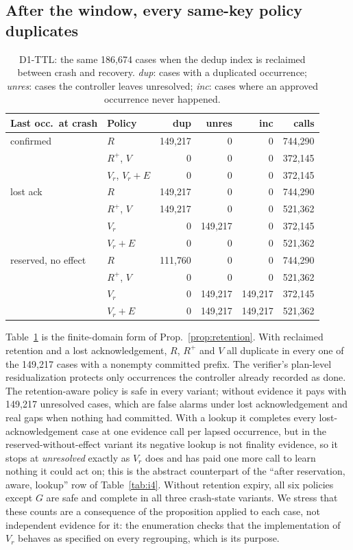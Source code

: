 \documentclass[conference,10pt]{IEEEtran}
\begin{document}
\subsection{After the window, every same-key policy duplicates}
\begin{table}[t]
\centering\footnotesize
\caption{D1-TTL: the same 186{,}674 cases when the dedup index is reclaimed between crash and recovery. \emph{dup}: cases with a duplicated occurrence; \emph{unres}: cases the controller leaves unresolved; \emph{inc}: cases where an approved occurrence never happened.}
\label{tab:d1ttl}
\setlength{\tabcolsep}{3.5pt}
\begin{tabular}{@{}llrrrr@{}}
\toprule
Last occ.\ at crash & Policy & dup & unres & inc & calls\\
\midrule
confirmed & $R$ & 149{,}217 & 0 & 0 & 744{,}290\\
 & $R^{+}$, $V$ & 0 & 0 & 0 & 372{,}145\\
 & $V_r$, $V_r{+}E$ & 0 & 0 & 0 & 372{,}145\\
\midrule
lost ack & $R$ & 149{,}217 & 0 & 0 & 744{,}290\\
 & $R^{+}$, $V$ & 149{,}217 & 0 & 0 & 521{,}362\\
 & $V_r$ & 0 & 149{,}217 & 0 & 372{,}145\\
 & $V_r{+}E$ & 0 & 0 & 0 & 521{,}362\\
\midrule
reserved, no effect & $R$ & 111{,}760 & 0 & 0 & 744{,}290\\
 & $R^{+}$, $V$ & 0 & 0 & 0 & 521{,}362\\
 & $V_r$ & 0 & 149{,}217 & 149{,}217 & 372{,}145\\
 & $V_r{+}E$ & 0 & 149{,}217 & 149{,}217 & 521{,}362\\
\bottomrule
\end{tabular}
\end{table}
Table~\ref{tab:d1ttl} is the finite-domain form of Prop.~\ref{prop:retention}. With reclaimed retention and a lost acknowledgement, $R$, $R^{+}$ and $V$ all duplicate in every one of the 149{,}217 cases with a nonempty committed prefix. The verifier's plan-level residualization protects only occurrences the controller already recorded as done. The retention-aware policy is safe in every variant; without evidence it pays with 149{,}217 unresolved cases, which are false alarms under lost acknowledgement and real gaps when nothing had committed. With a lookup it completes every lost-acknowledgement case at one evidence call per lapsed occurrence, but in the reserved-without-effect variant its negative lookup is not finality evidence, so it stops at \emph{unresolved} exactly as $V_r$ does and has paid one more call to learn nothing it could act on; this is the abstract counterpart of the ``after reservation, aware, lookup'' row of Table~\ref{tab:i4}. Without retention expiry, all six policies except $G$ are safe and complete in all three crash-state variants. We stress that these counts are a consequence of the proposition applied to each case, not independent evidence for it: the enumeration checks that the implementation of $V_r$ behaves as specified on every regrouping, which is its purpose.
\end{document}
